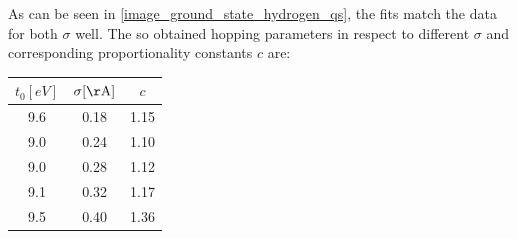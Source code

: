\newpage
As can be seen in \cref{image_ground_state_hydrogen_qs}, the fits match the data for both $\sigma$ well. The so obtained hopping parameters in respect to different $\sigma$ and corresponding proportionality constants $c$ are:
\begin{table}[!h]
\centering
\begin{tabular}{c|c|c}
$t_0 [\unit{eV}]$ & $\sigma [\unit{\AA}]$ & $c$\\
\hline \hline
9.6&0.18&1.15\\
9.0&0.24&1.10\\
9.0&0.28&1.12\\
9.1&0.32&1.17\\
9.5&0.40&1.36\\
\end{tabular}
\end{table}\\

